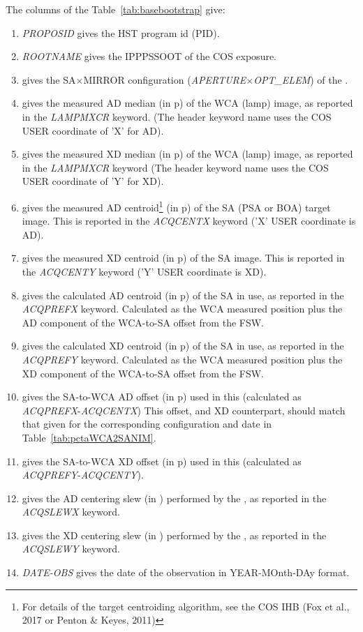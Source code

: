 The columns of the Table~\ref{tab:basebootstrap} give:
\footnotesize
\begin{enumerate}
\item \textit{PROPOSID} gives the HST program id (PID).
\item \textit{ROOTNAME} gives the IPPPSSOOT of the COS exposure.
\item gives the SA$\times$MIRROR configuration (\textit{APERTURE}$\times$\textit{OPT\_ELEM}) of the .
\item gives the measured AD median (in p) of the WCA (lamp) image, as reported in the  \textit{LAMPMXCR} keyword.
(The header keyword name uses the COS USER coordinate of 'X' for AD).
\item gives the measured XD median (in p) of the WCA (lamp) image, as reported in the \textit{LAMPMXCR} keyword (The header keyword name uses the COS USER coordinate of 'Y' for XD).
\item gives the measured AD centroid\footnote{For details of the  target centroiding algorithm, see the COS IHB (Fox et al., 2017 or Penton \& Keyes, 2011)} (in p) of the SA (PSA or BOA) target image. This is reported in the \textit{ACQCENTX} keyword ('X' USER coordinate is AD).
\item gives the measured XD centroid (in p) of the SA image. This is reported in the \textit{ACQCENTY} keyword ('Y' USER coordinate is XD).
\item gives the calculated AD centroid (in p) of the SA in use, as reported in the \textit{ACQPREFX} keyword. Calculated as the WCA measured position plus the AD component of the WCA-to-SA offset from the FSW.
\item gives the calculated XD centroid (in p) of the SA in use, as reported in the \textit{ACQPREFY} keyword. Calculated as the WCA measured position plus the XD component of the WCA-to-SA offset from the FSW.
\item gives the SA-to-WCA AD offset (in p) used in this  (calculated as \textit{ACQPREFX}-\textit{ACQCENTX}) This offset, and XD counterpart, should match that given for the corresponding configuration and date in Table~\ref{tab:pctaWCA2SANIM}.
\item gives the SA-to-WCA XD offset (in p) used in this  (calculated as \textit{ACQPREFY}-\textit{ACQCENTY}).
\item gives the AD centering slew (in \arcsec) performed by the , as reported in the \textit{ACQSLEWX} keyword.
\item gives the XD centering slew (in \arcsec) performed by the , as reported in the \textit{ACQSLEWY} keyword.
\item \textit{DATE-OBS} gives the date of the observation in YEAR-MOnth-DAy format.
\end{enumerate}
\normalsize

